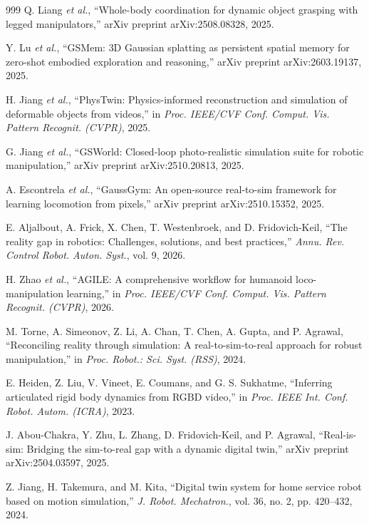 \documentclass[12pt,a4paper,oneside]{report}
\begin{document}
\begin{thebibliography}{999}
Q. Liang \textit{et al.}, ``Whole-body coordination for dynamic object grasping with legged manipulators,'' arXiv preprint arXiv:2508.08328, 2025.

Y. Lu \textit{et al.}, ``{GSMem}: {3D} Gaussian splatting as persistent spatial memory for zero-shot embodied exploration and reasoning,'' arXiv preprint arXiv:2603.19137, 2025.

H. Jiang \textit{et al.}, ``PhysTwin: Physics-informed reconstruction and simulation of deformable objects from videos,'' in \textit{Proc. IEEE/CVF Conf. Comput. Vis. Pattern Recognit. (CVPR)}, 2025.

G. Jiang \textit{et al.}, ``{GSWorld}: Closed-loop photo-realistic simulation suite for robotic manipulation,'' arXiv preprint arXiv:2510.20813, 2025.

A. Escontrela \textit{et al.}, ``{GaussGym}: An open-source real-to-sim framework for learning locomotion from pixels,'' arXiv preprint arXiv:2510.15352, 2025.

E. Aljalbout, A. Frick, X. Chen, T. Westenbroek, and D. Fridovich-Keil, ``The reality gap in robotics: Challenges, solutions, and best practices,'' \textit{Annu. Rev. Control Robot. Auton. Syst.}, vol. 9, 2026.

H. Zhao \textit{et al.}, ``{AGILE}: A comprehensive workflow for humanoid loco-manipulation learning,'' in \textit{Proc. IEEE/CVF Conf. Comput. Vis. Pattern Recognit. (CVPR)}, 2026.

M. Torne, A. Simeonov, Z. Li, A. Chan, T. Chen, A. Gupta, and P. Agrawal, ``Reconciling reality through simulation: A real-to-sim-to-real approach for robust manipulation,'' in \textit{Proc. Robot.: Sci. Syst. (RSS)}, 2024.

E. Heiden, Z. Liu, V. Vineet, E. Coumans, and G. S. Sukhatme, ``Inferring articulated rigid body dynamics from RGBD video,'' in \textit{Proc. IEEE Int. Conf. Robot. Autom. (ICRA)}, 2023.

J. Abou-Chakra, Y. Zhu, L. Zhang, D. Fridovich-Keil, and P. Agrawal, ``Real-is-sim: Bridging the sim-to-real gap with a dynamic digital twin,'' arXiv preprint arXiv:2504.03597, 2025.

Z. Jiang, H. Takemura, and M. Kita, ``Digital twin system for home service robot based on motion simulation,'' \textit{J. Robot. Mechatron.}, vol. 36, no. 2, pp. 420--432, 2024.


\end{thebibliography}
\end{document}
